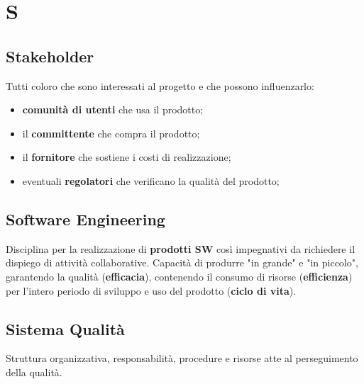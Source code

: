 \section{S}

    \subsection{Stakeholder}
    \label{glossario:stakeholder}
    Tutti coloro che sono interessati al progetto e che possono influenzarlo:
    \begin{itemize}
        \item \textbf{comunità di utenti} che usa il prodotto;
        \item il \textbf{committente} che compra il prodotto;
        \item il \textbf{fornitore} che sostiene i costi di realizzazione;
        \item eventuali \textbf{regolatori} che verificano la qualità del prodotto;
    \end{itemize}

    \subsection{Software Engineering}
    \label{glossario:softwareengineering}
    Disciplina per la realizzazione di \textbf{prodotti SW} così impegnativi da richiedere il dispiego di attività collaborative.
    Capacità di produrre "in grande" e "in piccolo", garantendo la qualità (\textbf{efficacia}), contenendo il consumo di risorse (\textbf{efficienza}) per l'intero periodo di sviluppo e uso del prodotto (\textbf{ciclo di vita}).

    \subsection{Sistema Qualità}
    \label{glossario:sistemaqualita}
    Struttura organizzativa, responsabilità, procedure e risorse atte al perseguimento della qualità.  
    
\pagebreak